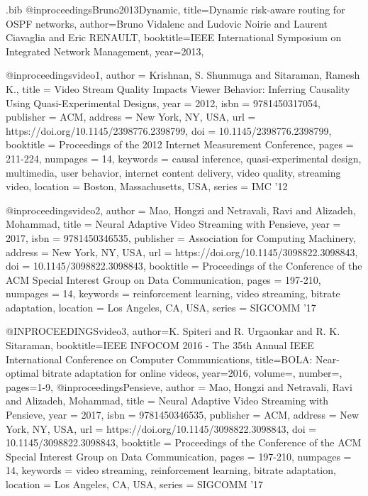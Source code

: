 \documentclass[sigconf]{acmart}
\begin{document}
\begin{filecontents}{\jobname.bib}
@inproceedings{Bruno2013Dynamic,
title={Dynamic risk-aware routing for OSPF networks},
 author={Bruno Vidalenc and Ludovic Noirie and Laurent Ciavaglia and Eric RENAULT},
 booktitle={IEEE International Symposium on Integrated Network Management},
 year={2013},
}

@inproceedings{video1, author = {Krishnan, S. Shunmuga and Sitaraman, Ramesh K.}, title = {Video Stream Quality Impacts Viewer Behavior: Inferring Causality Using Quasi-Experimental Designs}, year = {2012}, isbn = {9781450317054}, publisher = {ACM}, address = {New York, NY, USA}, url = {https://doi.org/10.1145/2398776.2398799}, doi = {10.1145/2398776.2398799}, booktitle = {Proceedings of the 2012 Internet Measurement Conference}, pages = {211-224}, numpages = {14}, keywords = {causal inference, quasi-experimental design, multimedia, user behavior, internet content delivery, video quality, streaming video}, location = {Boston, Massachusetts, USA}, series = {IMC '12} }

@inproceedings{video2, author = {Mao, Hongzi and Netravali, Ravi and Alizadeh, Mohammad}, title = {Neural Adaptive Video Streaming with Pensieve}, year = {2017}, isbn = {9781450346535}, publisher = {Association for Computing Machinery}, address = {New York, NY, USA}, url = {https://doi.org/10.1145/3098822.3098843}, doi = {10.1145/3098822.3098843}, booktitle = {Proceedings of the Conference of the ACM Special Interest Group on Data Communication}, pages = {197-210}, numpages = {14}, keywords = {reinforcement learning, video streaming, bitrate adaptation}, location = {Los Angeles, CA, USA}, series = {SIGCOMM '17} }

@INPROCEEDINGS{video3,
  author={K. {Spiteri} and R. {Urgaonkar} and R. K. {Sitaraman}},
  booktitle={IEEE INFOCOM 2016 - The 35th Annual IEEE International Conference on Computer Communications}, 
  title={BOLA: Near-optimal bitrate adaptation for online videos}, 
  year={2016},
  volume={},
  number={},
  pages={1-9},}
@inproceedings{Pensieve, author = {Mao, Hongzi and Netravali, Ravi and Alizadeh, Mohammad}, title = {Neural Adaptive Video Streaming with Pensieve}, year = {2017}, isbn = {9781450346535}, publisher = {ACM}, address = {New York, NY, USA}, url = {https://doi.org/10.1145/3098822.3098843}, doi = {10.1145/3098822.3098843}, booktitle = {Proceedings of the Conference of the ACM Special Interest Group on Data Communication}, pages = {197-210}, numpages = {14}, keywords = {video streaming, reinforcement learning, bitrate adaptation}, location = {Los Angeles, CA, USA}, series = {SIGCOMM '17} }


\end{filecontents}
\end{document}
